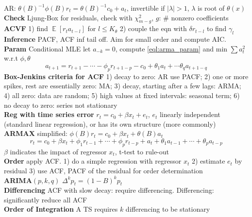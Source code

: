 \documentclass[10pt,landscape, a4paper]{article}
\theoremstyle{remark}
\newcommand{\E}{\operatorname{\mathbb{E}}}
\newcommand{\abs}[1]{\left\lvert #1 \right\rvert}
\begin{document}
\begin{multicols*}{3}
AR: $\theta(B)^{-1} \phi(B) r_t = \theta(B)^{-1} c_0 + a_t$, invertible if $\abs{\lambda}>1$, $\lambda$ is root of $\theta(x)$\\
\textbf{Check} Ljung-Box for residuals, check with $\chi^2_{m-g}$, $g$: \# nonzero coefficients\\
\textbf{ACVF} 1) find $\E [r_t a_{t-l}]$ for $l \leq K_\theta$ 2) couple the eqn with $\delta r_{t-l}$ to find $\gamma_l$\\
\textbf{Inference} PACF, ACF inf tail off. Aim for small order and compute AIC.\\
\textbf{Param} Conditional MLE let $a_{-k} = 0$, compute \ref{eql:arma_param} and min $\sum a^2_t$ w.r.t $\phi, \theta$
\begin{equation}
    a_{t+1} = r_{t+1} - \cdots - \phi_p r_{t+1-p} - c_0 + \theta_1 a_t + \cdots \theta_q a_{t+1-q}
    \label{eql:arma_param}
\end{equation}
\textbf{Box-Jenkins criteria for ACF} 1) decay to zero: AR use PACF; 2) one or more spikes, rest are essentially zero: MA; 3) decay, starting after a few lags: ARMA; 4) all zero: data are random; 5) high values at fixed intervals: seasonal term; 6) no decay to zero: series not stationary\\
\textbf{Reg with time series error} $r_t = c_0 + \beta x_t + e_t$, $e_t$ linearly independent (standard linear regression), or has its own structure (more commonly)\\
\textbf{ARMAX} simplified: $\phi(B) r_t = c_0 + \beta x_t + \theta(B) a_t$
\begin{equation*}
    r_t = c_0 + \beta x_t + \phi_1 r_{t-1} +\cdots + \phi_p r_{t-p} + a_t + \theta_1 a_{t-1} + \cdots + \theta_p a_{t-p}    
\end{equation*}
$\beta$ indicates the impact of regressor $x_t$, t-test to rule-out\\
\textbf{Order} apply ACF. 1) do a simple regression with regressor $x_t$ 2) estimate $e_t$ by residual 3) use ACF, PACF of the residual for order determination\\

\textbf{ARIMA$(p, k, q)$} $\Delta^k p_t = (1-B)^k p_t$\\
\textbf{Differencing} ACF with slow decay: require differencing. Differencing: significantly reduce all ACF\\
\textbf{Order of Integration} A TS requires $k$ differencing to be stationary\\


\end{multicols*}
\end{document}

